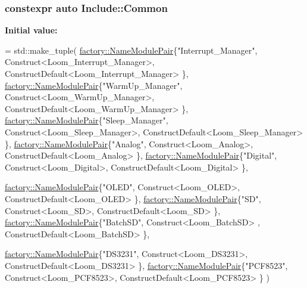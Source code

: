 \subsubsection[{\texorpdfstring{Common}{Common}}]{\setlength{\rightskip}{0pt plus 5cm}constexpr auto Include\+::\+Common}\hypertarget{namespace_include_afd5c6184c21e5cbb570f6ffb451fadb2}{}\label{namespace_include_afd5c6184c21e5cbb570f6ffb451fadb2}
{\bfseries Initial value\+:}
\begin{DoxyCode}
= std::make\_tuple(
                \hyperlink{structfactory_1_1_name_module_pair}{factory::NameModulePair}\{\textcolor{stringliteral}{"Interrupt\_Manager"}, 
      Construct<Loom\_Interrupt\_Manager>,      ConstructDefault<Loom\_Interrupt\_Manager> \},
                \hyperlink{structfactory_1_1_name_module_pair}{factory::NameModulePair}\{\textcolor{stringliteral}{"WarmUp\_Manager"}, 
      Construct<Loom\_WarmUp\_Manager>, ConstructDefault<Loom\_WarmUp\_Manager> \},
                \hyperlink{structfactory_1_1_name_module_pair}{factory::NameModulePair}\{\textcolor{stringliteral}{"Sleep\_Manager"},     
      Construct<Loom\_Sleep\_Manager>,          ConstructDefault<Loom\_Sleep\_Manager> \},
                \hyperlink{structfactory_1_1_name_module_pair}{factory::NameModulePair}\{\textcolor{stringliteral}{"Analog"},        Construct<Loom\_Analog>,         
      ConstructDefault<Loom\_Analog> \},
                \hyperlink{structfactory_1_1_name_module_pair}{factory::NameModulePair}\{\textcolor{stringliteral}{"Digital"},       Construct<Loom\_Digital>,        
      ConstructDefault<Loom\_Digital> \},
                
                \hyperlink{structfactory_1_1_name_module_pair}{factory::NameModulePair}\{\textcolor{stringliteral}{"OLED"},          Construct<Loom\_OLED>,           
      ConstructDefault<Loom\_OLED> \},
                \hyperlink{structfactory_1_1_name_module_pair}{factory::NameModulePair}\{\textcolor{stringliteral}{"SD"},            Construct<Loom\_SD>,             
      ConstructDefault<Loom\_SD> \},
                \hyperlink{structfactory_1_1_name_module_pair}{factory::NameModulePair}\{\textcolor{stringliteral}{"BatchSD"},           Construct<Loom\_BatchSD>
      ,                ConstructDefault<Loom\_BatchSD> \},
                
                \hyperlink{structfactory_1_1_name_module_pair}{factory::NameModulePair}\{\textcolor{stringliteral}{"DS3231"},        Construct<Loom\_DS3231>,         
      ConstructDefault<Loom\_DS3231> \},
                \hyperlink{structfactory_1_1_name_module_pair}{factory::NameModulePair}\{\textcolor{stringliteral}{"PCF8523"},       Construct<Loom\_PCF8523>,        
      ConstructDefault<Loom\_PCF8523> \}
            )
\end{DoxyCode}


